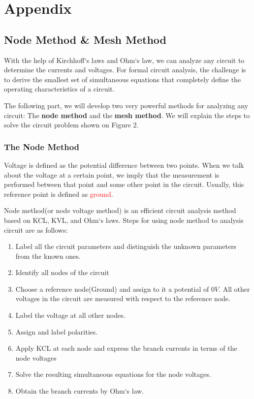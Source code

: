 \documentclass[a4 paper]{article}
\newcommand{\red}[1]{\textcolor{red}{#1}}
\numberwithin{equation}{section}
\newcommand{\0}{\mathbf{0}}
\begin{document}
\section{Appendix}
\subsection{Node Method \& Mesh Method}
With the help of Kirchhoff`s laws and Ohm`s law, we can analyze any circuit to determine the currents and voltages. For formal circuit analysis, the challenge is to derive the smallest set of simultaneous equations that completely define the operating characteristics of a circuit.

The following part, we will develop two very powerful methods for analyzing any circuit: The {\bf node method} and the {\bf mesh method}. We will explain the steps to solve the circuit problem shown on Figure 2.











\subsubsection{The Node Method}


Voltage is defined as the potential difference between two points. When we talk about the voltage at a certain point, we imply that the measurement is performed between that point and some other point in the circuit. Usually, this reference point is defined as \red{ground}.

Node method(or node voltage method) is an efficient circuit analysis method based on KCL, KVL, and Ohm`s laws. Steps for using node method to analysis circuit are as follows:

\begin{enumerate} \itemsep1pt \parskip0pt 
  \item Label all the circuit parameters and distinguish the unknown parameters from the known ones.
  \item Identify all nodes of the circuit
  \item Choose a reference node(Ground) and assign to it a potential of $0V$. All other voltages in the circuit are measured with respect to the reference node.
  \item Label the voltage at all other nodes.
  \item Assign and label polarities.
  \item Apply KCL at each node and express the branch currents in terms of the node voltages
  \item Solve the resulting simultaneous equations for the node voltages.
  \item Obtain the branch currents by Ohm`s law.
\end{enumerate}
\end{document}
